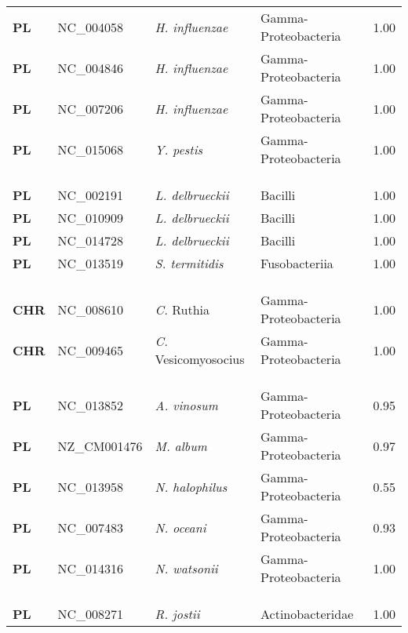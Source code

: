 \begin{adjustwidth}{-3cm}{2cm}
{\begin{supertabular}{>{\bfseries}l|p{0.1\textwidth}p{0.14\textwidth}l|l}
PL & NC\_004058 & \textit{H. influenzae} & Gamma-Proteobacteria & 1.00\\
PL & NC\_004846 & \textit{H. influenzae} & Gamma-Proteobacteria & 1.00\\
PL & NC\_007206 & \textit{H. influenzae} & Gamma-Proteobacteria & 1.00\\
PL & NC\_015068 & \textit{Y. pestis} & Gamma-Proteobacteria & 1.00\\
\\
\\
\hline\\
PL & NC\_002191 & \textit{L. delbrueckii} & Bacilli & 1.00\\
PL & NC\_010909 & \textit{L. delbrueckii} & Bacilli & 1.00\\
PL & NC\_014728 & \textit{L. delbrueckii} & Bacilli & 1.00\\
PL & NC\_013519 & \textit{S. termitidis} & Fusobacteriia & 1.00\\
\\
\\
\hline\\ 
CHR & NC\_008610 & \textit{C.} Ruthia & Gamma-Proteobacteria & 1.00\\
CHR & NC\_009465 & \textit{C.} Vesicomyosocius & Gamma-Proteobacteria & 1.00\\
\\
\\
\hline\\
PL & NC\_013852 & \textit{A. vinosum} & Gamma-Proteobacteria & 0.95\\
PL & NZ\_CM001476 & \textit{M. album} & Gamma-Proteobacteria & 0.97\\
PL & NC\_013958 & \textit{N. halophilus} & Gamma-Proteobacteria & 0.55\\
PL & NC\_007483 & \textit{N. oceani} & Gamma-Proteobacteria & 0.93\\
PL & NC\_014316 & \textit{N. watsonii} & Gamma-Proteobacteria & 1.00\\
\\
\\
\hline\\
PL & NC\_008271 & \textit{R. jostii} & Actinobacteridae & 1.00\\

\end{supertabular}}
\end{adjustwidth}
